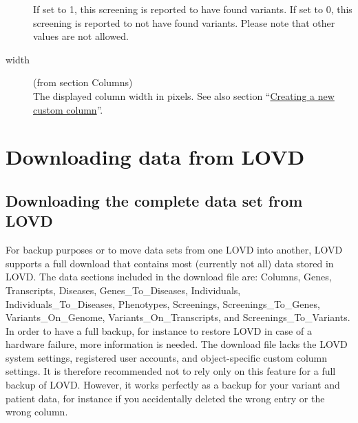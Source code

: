 \documentclass[a4paper,oneside,openany,12pt]{memoir}
\renewenvironment{leftbar}[1][\hsize]
{%
    \def\FrameCommand
    {%
        {\color{LOVDdark}\vrule width 3pt \hspace{5pt}}%
        \colorbox{LOVDlight}%
    }%
    \MakeFramed{\hsize#1\advance\hsize-\width\FrameRestore}%
}
{\endMakeFramed}
\begin{document}
\begin{description}
  If set to 1, this screening is reported to have found variants.
  If set to 0, this screening is reported to not have found variants.
  Please note that other values are not allowed.
  \item[width] (from section Columns)\hfill \\
  The displayed column width in pixels.
  See also section ``\hyperlink{sec:custom_column_create}{Creating a new custom column}''.
\end{description}





\hypertarget{sec:download_data}{}
\section{Downloading data from LOVD}

\hypertarget{ssec:download_full_data}{}
\subsection{Downloading the complete data set from LOVD}
For backup purposes or to move data sets from one LOVD into another, LOVD supports a full download that contains most (currently not all) data stored in LOVD.
The data sections included in the download file are: Columns, Genes, Transcripts, Diseases, Genes\_To\_Diseases, Individuals, Individuals\_To\_Diseases,
 Phenotypes, Screenings, Screenings\_To\_Genes, Variants\_On\_Genome, Variants\_On\_Transcripts, and Screenings\_To\_Variants.
In order to have a full backup, for instance to restore LOVD in case of a hardware failure, more information is needed.
The download file lacks the LOVD system settings, registered user accounts, and object-specific custom column settings.
It is therefore recommended not to rely only on this feature for a full backup of LOVD.
However, it works perfectly as a backup for your variant and patient data, for instance if you accidentally deleted the wrong entry or the wrong column.
\end{document}
